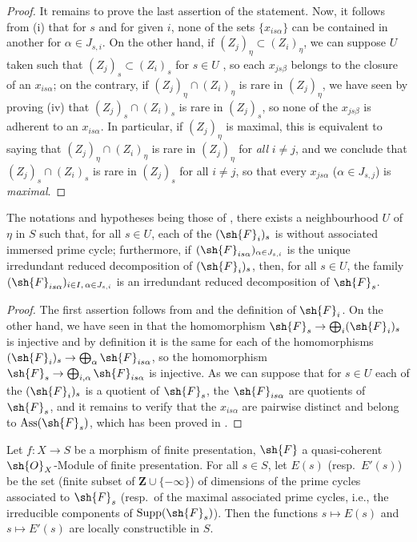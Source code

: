 \begin{proof}
It remains to prove the last assertion of the statement.
Now, it follows from (i) that for $s$ and for given $i$, none of the sets $\{x_{is\alpha}\}$ can be contained in another for $\alpha\in J_{s,i}$.
On the other hand, if $(Z_j)_\eta\subset(Z_i)_\eta$, we can suppose $U$ taken such that $(Z_j)_s\subset(Z_i)_s$ for $s\in U$ , so each $x_{js\beta}$ belongs to the closure of an $x_{is\alpha}$; on the contrary, if $(Z_j)_\eta\cap(Z_i)_\eta$ is rare in $(Z_j)_\eta$, we have seen by proving (iv) that $(Z_j)_s\cap(Z_i)_s$ is rare in $(Z_j)_s$, so none of the $x_{js\beta}$ is adherent to an $x_{is\alpha}$.
In particular, if $(Z_j)_\eta$ is maximal, this is equivalent to saying that $(Z_j)_\eta\cap(Z_i)_\eta$ is rare in $(Z_j)_\eta$ for \emph{all} $i\neq j$, and we conclude that $(Z_j)_s\cap(Z_i)_s$ is rare in $(Z_j)_s$ for all $i\neq j$, so that every $x_{js\alpha}$ ($\alpha\in J_{s,j}$) is \emph{maximal}.
\end{proof}

\begin{corollary}[9.8.4]
\label{IV.9.8.4}
The notations and hypotheses being those of \emph{}, there exists a neighbourhood $U$ of $\eta$ in $S$ such that, for all $s\in U$, each of the $(\sh{F}_i)_s$ is without associated immersed prime cycle; furthermore, if $(\sh{F}_{is\alpha})_{\alpha\in J_{s,i}}$ is the unique irredundant reduced decomposition of $(\sh{F}_i)_s$, then, for all $s\in U$, the family $(\sh{F}_{is\alpha})_{i\in I,\,\alpha\in J_{s,i}}$ is an irredundant reduced decomposition of $\sh{F}_s$.
\end{corollary}

\begin{proof}
\label{IV.9.8.4-proof}
The first assertion follows from  and the definition of $\sh{F}_i$.
On the other hand, we have seen in  that the homomorphism $\sh{F}_s\to\bigoplus_i(\sh{F}_i)_s$ is injective and by definition it is the same for each of the homomorphisms $(\sh{F}_i)_s\to\bigoplus_\alpha\sh{F}_{is\alpha}$, so the homomorphism $\sh{F}_s\to\bigoplus_{i,\alpha}\sh{F}_{is\alpha}$ is injective.
As we can suppose  that for $s\in U$ each of the $(\sh{F}_i)_s$ is a quotient of $\sh{F}_s$, the $\sh{F}_{is\alpha}$ are quotients of $\sh{F}_s$, and it remains to verify  that the $x_{is\alpha}$ are pairwise distinct and belong to $\operatorname{Ass}(\sh{F}_s)$, which has been proved in .
\end{proof}

\begin{proposition}[9.8.5]
\label{IV.9.8.5}
Let $f:X\to S$ be a morphism of finite presentation, $\sh{F}$ a quasi-coherent $\sh{O}_X$-Module of finite presentation.
For all $s\in S$, let $E(s)$ (resp.~$E'(s)$) be the set (finite subset of $\mathbf{Z}\cup\{-\infty\}$) of dimensions of the prime cycles associated to $\sh{F}_s$ (resp.~of the maximal associated prime cycles, i.e., the irreducible components of $\operatorname{Supp}(\sh{F}_s)$).
Then the functions $s\mapsto E(s)$ and $s\mapsto E'(s)$ are locally constructible in $S$.
\end{proposition}

